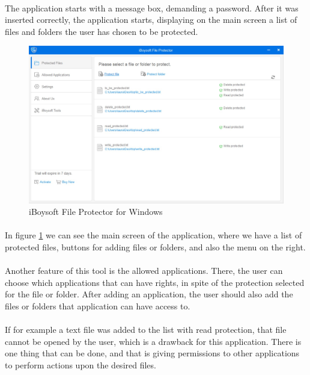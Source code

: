 	\paragraph{}
	The application starts with a message box, demanding a password. After it was inserted correctly, the application starts, displaying on the main screen a list of files and folders the user has chosen to be protected.
	
	\begin{figure}[h!]
		\includegraphics[width=\linewidth]{images/iBoysoftMain.jpg}
		\caption{iBoysoft File Protector for Windows}
		\label{fig:iBoysoftFP}
	\end{figure}
	
	\paragraph{}
	In figure \ref{fig:iBoysoftFP} we can see the main screen of the application, where we have a list of protected files, buttons for adding files or folders, and also the menu on the right. 
	
	\paragraph{}
	Another feature of this tool is the allowed applications. There, the user can choose which applications that can have rights, in spite of the protection selected for the file or folder. After adding an application, the user should also add the files or folders that application can have access to.
	
	\paragraph{}
	If for example a text file was added to the list with read protection, that file cannot be opened by the user, which is a drawback for this application. There is one thing that can be done, and that is giving permissions to other applications to perform actions upon the desired files.
	
